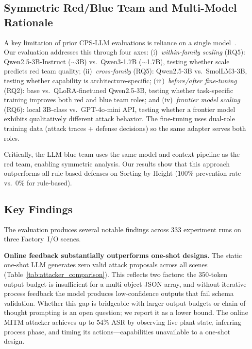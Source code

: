 \subsection{Symmetric Red/Blue Team and Multi-Model Rationale}

A key limitation of prior CPS-LLM evaluations is reliance on a single model~\cite{ahmed2025attackllm}. Our evaluation addresses this through four axes: (i)~\emph{within-family scaling} (RQ5): Qwen2.5-3B-Instruct (${\sim}$3B) vs.\ Qwen3-1.7B (${\sim}$1.7B), testing whether scale predicts red team quality; (ii)~\emph{cross-family} (RQ5): Qwen2.5-3B vs.\ SmolLM3-3B, testing whether capability is architecture-specific; (iii)~\emph{before/after fine-tuning} (RQ2): base vs.\ QLoRA-finetuned Qwen2.5-3B, testing whether task-specific training improves both red and blue team roles; and (iv)~\emph{frontier model scaling} (RQ6): local 3B-class vs.\ GPT-4o-mini API, testing whether a frontier model exhibits qualitatively different attack behavior. The fine-tuning uses dual-role training data (attack traces + defense decisions) so the same adapter serves both roles.

Critically, the LLM blue team uses the same model and context pipeline as the red team, enabling symmetric analysis. Our results show that this approach outperforms all rule-based defenses on Sorting by Height (100\% prevention rate vs.\ 0\% for rule-based).

\subsection{Key Findings}

The evaluation produces several notable findings across 333 experiment runs on three Factory~I/O scenes.

\textbf{Online feedback substantially outperforms one-shot designs.} The static one-shot LLM generates zero valid attack proposals across all scenes (Table~\ref{tab:attacker_comparison}). This reflects two factors: the 350-token output budget is insufficient for a multi-object JSON array, and without iterative process feedback the model produces low-confidence outputs that fail schema validation. Whether this gap is bridgeable with larger output budgets or chain-of-thought prompting is an open question; we report it as a lower bound. The online MITM attacker achieves up to 54\% ASR by observing live plant state, inferring process phase, and timing its actions---capabilities unavailable to a one-shot design.

